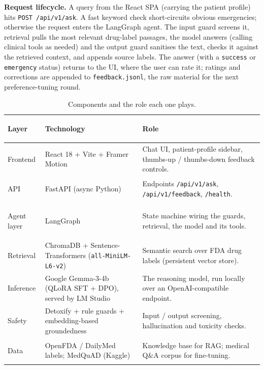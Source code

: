 \documentclass[11pt,a4paper]{article}
\begin{document}
\noindent\textbf{Request lifecycle.} A query from the React SPA (carrying the patient profile) hits
\texttt{POST /api/v1/ask}. A fast keyword check short-circuits obvious emergencies; otherwise the
request enters the LangGraph agent. The input guard screens it, retrieval pulls the most relevant
drug-label passages, the model answers (calling clinical tools as needed)
and the output guard sanitises the text, checks it against the retrieved context, and appends source
labels. The answer (with a \texttt{success} or \texttt{emergency} status) returns to the UI, where the
user can rate it; ratings and corrections are appended to \texttt{feedback.jsonl}, the raw material
for the next preference-tuning round.

\begin{table}[H]
\centering
\renewcommand{\arraystretch}{1.25}
\caption{Components and the role each one plays.}
\begin{tabular}{@{}>{\bfseries\raggedright\arraybackslash}p{}
                   >{\raggedright\arraybackslash}p{}
                   >{\raggedright\arraybackslash}p{}@{}}
\toprule
\normalfont\bfseries Layer & \normalfont\bfseries Technology & \normalfont\bfseries Role\\
\midrule
Frontend & React 18 + Vite + Framer Motion & Chat UI, patient-profile sidebar, thumbs-up / thumbs-down feedback controls.\\[3pt]
API & FastAPI (async Python) & Endpoints \texttt{/api/v1/ask}, \texttt{/api/v1/feedback}, \texttt{/health}.\\[3pt]
Agent layer & LangGraph & State machine wiring the guards, retrieval, the model and its tools.\\[3pt]
Retrieval & ChromaDB + Sentence-Transformers (\texttt{all-MiniLM-L6-v2}) & Semantic search over FDA drug labels (persistent vector store).\\[3pt]
Inference & Google Gemma-3-4b (QLoRA SFT + DPO), served by LM Studio & The reasoning model, run locally over an OpenAI-compatible endpoint.\\[3pt]
Safety & Detoxify + rule guards + embedding-based groundedness & Input / output screening, hallucination and toxicity checks.\\[3pt]
Data & OpenFDA / DailyMed labels; MedQuAD (Kaggle) & Knowledge base for RAG; medical Q\&A corpus for fine-tuning.\\
\bottomrule
\end{tabular}
\end{table}
\end{document}
